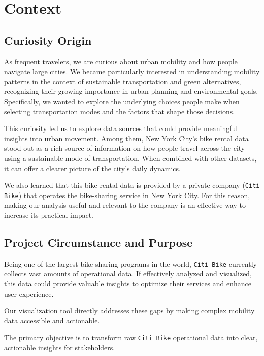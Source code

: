 \section{Context}

\subsection{Curiosity Origin}
As frequent travelers, we are curious about urban mobility and how people navigate large cities.
We became particularly interested in understanding mobility patterns in the context of sustainable transportation and green alternatives, recognizing their growing importance in urban planning and environmental goals.
Specifically, we wanted to explore the underlying choices people make when selecting transportation modes and the factors that shape those decisions.

This curiosity led us to explore data sources that could provide meaningful insights into urban movement.
Among them, New York City's bike rental data stood out as a rich source of information on how people travel across the city using a sustainable mode of transportation.
When combined with other datasets, it can offer a clearer picture of the city's daily dynamics.

We also learned that this bike rental data is provided by a private company (\texttt{Citi Bike}) that operates the bike-sharing service in New York City.
For this reason, making our analysis useful and relevant to the company is an effective way to increase its practical impact.

\subsection{Project Circumstance and Purpose}
Being one of the largest bike-sharing programs in the world, \texttt{Citi Bike} currently collects vast amounts of operational data. 
If effectively analyzed and visualized, this data could provide valuable insights to optimize their services and enhance user experience.

Our visualization tool directly addresses these gaps by making complex mobility data accessible and actionable.

The primary objective is to transform raw \texttt{Citi Bike} operational data into clear, actionable insights for stakeholders.

